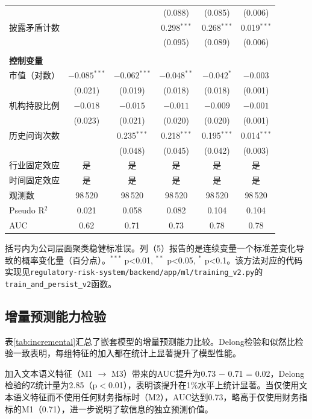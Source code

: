 \begin{table}[H]
\begin{threeparttable}
\begin{tabular}{lccccc}
 & & & (0.088) & (0.085) & (0.006) \\
披露矛盾计数 & & & 0.298$^{***}$ & 0.268$^{***}$ & 0.019$^{***}$ \\
 & & & (0.095) & (0.089) & (0.006) \\
\\
\textbf{控制变量} & & & & & \\
市值（对数） & $-0.085^{***}$ & $-0.062^{***}$ & $-0.048^{**}$ & $-0.042^{*}$ & $-0.003$ \\
 & (0.021) & (0.019) & (0.018) & (0.018) & (0.001) \\
机构持股比例 & $-0.018$ & $-0.015$ & $-0.011$ & $-0.009$ & $-0.001$ \\
 & (0.023) & (0.021) & (0.020) & (0.020) & (0.001) \\
历史问询次数 & & 0.235$^{***}$ & 0.218$^{***}$ & 0.195$^{***}$ & 0.014$^{***}$ \\
 & & (0.048) & (0.045) & (0.042) & (0.003) \\
\midrule
行业固定效应 & 是 & 是 & 是 & 是 & 是 \\
时间固定效应 & 是 & 是 & 是 & 是 & 是 \\
\midrule
观测数 & 98\,520 & 98\,520 & 98\,520 & 98\,520 & 98\,520 \\
Pseudo R$^2$ & 0.021 & 0.058 & 0.082 & 0.104 & 0.104 \\
AUC & 0.62 & 0.71 & 0.73 & 0.78 & 0.78 \\
\bottomrule
\end{tabular}
\begin{tablenotes}
\item[注] 括号内为公司层面聚类稳健标准误。列（5）报告的是连续变量一个标准差变化导致的概率变化量（百分点）。$^{***}$ p<0.01, $^{**}$ p<0.05, $^{*}$ p<0.1。该方法对应的代码实现见\texttt{regulatory-risk-system/backend/app/ml/training\_v2.py}的\texttt{train\_and\_persist\_v2}函数。
\end{tablenotes}
\end{threeparttable}
\end{table}

\subsection{增量预测能力检验}

表\ref{tab:incremental}汇总了嵌套模型的增量预测能力比较。Delong检验和似然比检验一致表明，每组特征的加入都在统计上显著提升了模型性能。

加入文本语义特征（M1 $\rightarrow$ M3）带来的AUC提升为0.73 $-$ 0.71 = 0.02，Delong检验的Z统计量为2.85（p$<$0.01），表明该提升在1\%水平上统计显著。当仅使用文本语义特征而不使用任何财务指标时（M2），AUC达到0.73，略高于仅使用财务指标的M1（0.71），进一步说明了软信息的独立预测价值。

